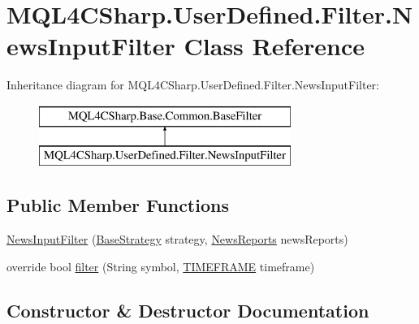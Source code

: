 \hypertarget{class_m_q_l4_c_sharp_1_1_user_defined_1_1_filter_1_1_news_input_filter}{}\section{M\+Q\+L4\+C\+Sharp.\+User\+Defined.\+Filter.\+News\+Input\+Filter Class Reference}
\label{class_m_q_l4_c_sharp_1_1_user_defined_1_1_filter_1_1_news_input_filter}
Inheritance diagram for M\+Q\+L4\+C\+Sharp.\+User\+Defined.\+Filter.\+News\+Input\+Filter\+:\begin{figure}[H]
\begin{center}
\leavevmode
\includegraphics[height=2.000000cm]{class_m_q_l4_c_sharp_1_1_user_defined_1_1_filter_1_1_news_input_filter}
\end{center}
\end{figure}
\subsection*{Public Member Functions}
\begin{DoxyCompactItemize}
\item 
\hyperlink{class_m_q_l4_c_sharp_1_1_user_defined_1_1_filter_1_1_news_input_filter_a4d276c4c75c71607f4470a09fcc11593}{News\+Input\+Filter} (\hyperlink{class_m_q_l4_c_sharp_1_1_base_1_1_base_strategy}{Base\+Strategy} strategy, \hyperlink{class_m_q_l4_c_sharp_1_1_user_defined_1_1_input_1_1_news_reports}{News\+Reports} news\+Reports)
\item 
override bool \hyperlink{class_m_q_l4_c_sharp_1_1_user_defined_1_1_filter_1_1_news_input_filter_a5ad87945db5d2058878d18d88b9760a7}{filter} (String symbol, \hyperlink{namespace_m_q_l4_c_sharp_1_1_base_1_1_enums_a838810aaa87c63c12737408dba8c0b35}{T\+I\+M\+E\+F\+R\+A\+ME} timeframe)
\end{DoxyCompactItemize}


\subsection{Constructor \& Destructor Documentation}
